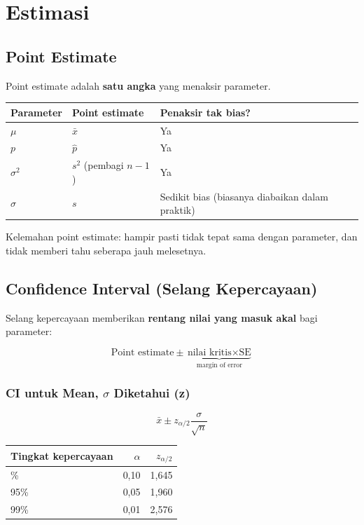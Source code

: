 \documentclass[
  indonesian,
  letterpaper,
]{book}
\newcounter{none} %
\begin{document}
\section{Estimasi}\label{estimasi}

\subsection{Point Estimate}\label{point-estimate}

Point estimate adalah \textbf{satu angka} yang menaksir parameter.

{\def\LTcaptype{none} %
\begin{longtable}[]{@{}lll@{}}
\toprule\noalign{}
Parameter & Point estimate & Penaksir tak bias? \\
\midrule\noalign{}
\endhead
\bottomrule\noalign{}
\endlastfoot
\(\mu\) & \(\bar{x}\) & Ya \\
\(p\) & \(\hat{p}\) & Ya \\
\(\sigma^2\) & \(s^2\) (pembagi \(n-1\)) & Ya \\
\(\sigma\) & \(s\) & Sedikit bias (biasanya diabaikan dalam praktik) \\
\end{longtable}
}

Kelemahan point estimate: hampir pasti tidak tepat sama dengan
parameter, dan tidak memberi tahu seberapa jauh melesetnya.

\subsection{Confidence Interval (Selang
Kepercayaan)}\label{confidence-interval-selang-kepercayaan}

Selang kepercayaan memberikan \textbf{rentang nilai yang masuk akal}
bagi parameter:

\[
\text{Point estimate} \pm \underbrace{\text{nilai kritis} \times \text{SE}}_{\text{margin of error}}
\]

\subsubsection{\texorpdfstring{CI untuk Mean, \(\sigma\) Diketahui
(z)}{CI untuk Mean, \textbackslash sigma Diketahui (z)}}\label{ci-untuk-mean-sigma-diketahui-z}

\[
\bar{x} \pm z_{\alpha/2}\frac{\sigma}{\sqrt{n}}
\]

{\def\LTcaptype{none} %
\begin{longtable}[]{@{}lrr@{}}
\toprule\noalign{}
Tingkat kepercayaan & \(\alpha\) & \(z_{\alpha/2}\) \\
\midrule\noalign{}
\endhead
\bottomrule\noalign{}
\endlastfoot
90\% & 0,10 & 1,645 \\
95\% & 0,05 & 1,960 \\
99\% & 0,01 & 2,576 \\
\end{longtable}
}
\end{document}
